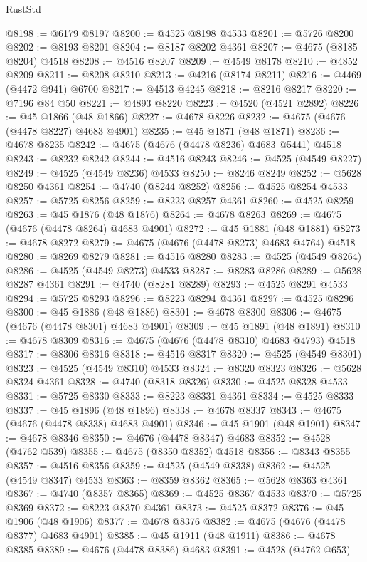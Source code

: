 \begin{lexlean}{RustStd}
\begin{coremodule}
@8198 := @6179 @8197
@8200 := @4525 @8198 @4533
@8201 := @5726 @8200
@8202 := @8193 @8201
@8204 := @8187 @8202 @4361
@8207 := @4675 (@8185 @8204) @4518
@8208 := @4516 @8207
@8209 := @4549 @8178
@8210 := @4852 @8209
@8211 := @8208 @8210
@8213 := @4216 (@8174 @8211)
@8216 := @4469 (@4472 @941) @6700
@8217 := @4513 @4245
@8218 := @8216 @8217
@8220 := @7196 @84 @50
@8221 := @4893 @8220
@8223 := @4520 (@4521 @2892)
@8226 := @45 @1866 (@48 @1866)
@8227 := @4678 @8226
@8232 := @4675 (@4676 (@4478 @8227) @4683 @4901)
@8235 := @45 @1871 (@48 @1871)
@8236 := @4678 @8235
@8242 := @4675 (@4676 (@4478 @8236) @4683 @5441) @4518
@8243 := @8232 @8242
@8244 := @4516 @8243
@8246 := @4525 (@4549 @8227)
@8249 := @4525 (@4549 @8236) @4533
@8250 := @8246 @8249
@8252 := @5628 @8250 @4361
@8254 := @4740 (@8244 @8252)
@8256 := @4525 @8254 @4533
@8257 := @5725 @8256
@8259 := @8223 @8257 @4361
@8260 := @4525 @8259
@8263 := @45 @1876 (@48 @1876)
@8264 := @4678 @8263
@8269 := @4675 (@4676 (@4478 @8264) @4683 @4901)
@8272 := @45 @1881 (@48 @1881)
@8273 := @4678 @8272
@8279 := @4675 (@4676 (@4478 @8273) @4683 @4764) @4518
@8280 := @8269 @8279
@8281 := @4516 @8280
@8283 := @4525 (@4549 @8264)
@8286 := @4525 (@4549 @8273) @4533
@8287 := @8283 @8286
@8289 := @5628 @8287 @4361
@8291 := @4740 (@8281 @8289)
@8293 := @4525 @8291 @4533
@8294 := @5725 @8293
@8296 := @8223 @8294 @4361
@8297 := @4525 @8296
@8300 := @45 @1886 (@48 @1886)
@8301 := @4678 @8300
@8306 := @4675 (@4676 (@4478 @8301) @4683 @4901)
@8309 := @45 @1891 (@48 @1891)
@8310 := @4678 @8309
@8316 := @4675 (@4676 (@4478 @8310) @4683 @4793) @4518
@8317 := @8306 @8316
@8318 := @4516 @8317
@8320 := @4525 (@4549 @8301)
@8323 := @4525 (@4549 @8310) @4533
@8324 := @8320 @8323
@8326 := @5628 @8324 @4361
@8328 := @4740 (@8318 @8326)
@8330 := @4525 @8328 @4533
@8331 := @5725 @8330
@8333 := @8223 @8331 @4361
@8334 := @4525 @8333
@8337 := @45 @1896 (@48 @1896)
@8338 := @4678 @8337
@8343 := @4675 (@4676 (@4478 @8338) @4683 @4901)
@8346 := @45 @1901 (@48 @1901)
@8347 := @4678 @8346
@8350 := @4676 (@4478 @8347) @4683
@8352 := @4528 (@4762 @539)
@8355 := @4675 (@8350 @8352) @4518
@8356 := @8343 @8355
@8357 := @4516 @8356
@8359 := @4525 (@4549 @8338)
@8362 := @4525 (@4549 @8347) @4533
@8363 := @8359 @8362
@8365 := @5628 @8363 @4361
@8367 := @4740 (@8357 @8365)
@8369 := @4525 @8367 @4533
@8370 := @5725 @8369
@8372 := @8223 @8370 @4361
@8373 := @4525 @8372
@8376 := @45 @1906 (@48 @1906)
@8377 := @4678 @8376
@8382 := @4675 (@4676 (@4478 @8377) @4683 @4901)
@8385 := @45 @1911 (@48 @1911)
@8386 := @4678 @8385
@8389 := @4676 (@4478 @8386) @4683
@8391 := @4528 (@4762 @653)

\end{coremodule}
\end{lexlean}
